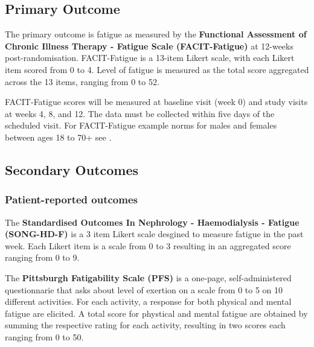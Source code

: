 \documentclass[
]{article}
\begin{document}
\hypertarget{primary-outcome}{
  \subsection{Primary Outcome}\label{primary-outcome}}

The primary outcome is fatigue as measured by the \textbf{Functional Assessment of Chronic Illness Therapy - Fatigue Scale (FACIT-Fatigue)} \cites{yellen1997measuring}{cella2002fatigue} at 12-weeks post-randomisation.
FACIT-Fatigue is a 13-item Likert scale, with each Likert item scored from 0 to 4.
Level of fatigue is measured as the total score aggregated across the 13 items, ranging from 0 to 52.

FACIT-Fatigue scores will be measured at baseline visit (week 0) and study visits at weeks 4, 8, and 12.
The data must be collected within five days of the scheduled visit.
For FACIT-Fatigue example norms for males and females between ages 18 to 70+ see \cite{montan2018general}.

\hypertarget{secondary-outcomes}{
  \subsection{Secondary Outcomes}\label{secondary-outcomes}}

\hypertarget{pro-outcomes}{
  \subsubsection{Patient-reported outcomes}\label{pro-outcomes}}

\label{outcome:song-hd-f}
The \textbf{Standardised Outcomes In Nephrology - Haemodialysis - Fatigue (SONG-HD-F)} \cite{ju2018establishing} is a 3 item Likert scale desgined to measure fatigue in the past week.
Each Likert item is a scale from 0 to 3 resulting in an aggregated score ranging from 0 to 9.

\label{outcome:pfs}
The \textbf{Pittsburgh Fatigability Scale (PFS)} \cite{glynn2015pittsburgh} is a one-page, self-administered questionnarie that asks about level of exertion on a scale from 0 to 5 on 10 different activities.
For each activity, a response for both physical and mental fatigue are elicited.
A total score for phystical and mental fatigue are obtained by summing the respective rating for each activity, resulting in two scores each ranging from 0 to 50.
\end{document}
